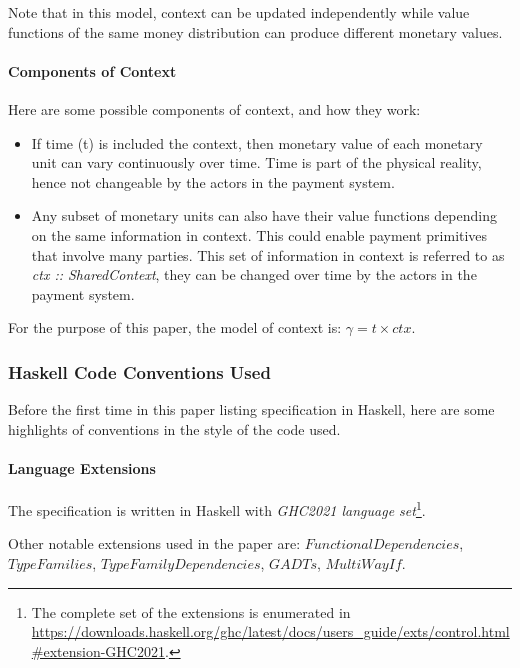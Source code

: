 Note that in this model, context can be updated independently while value functions of the same
money distribution can produce different monetary values.

\paragraph{Components of Context}

Here are some possible components of context, and how they work:

\begin{itemize}
    \item If time (t) is included the context, then monetary value of each monetary unit can vary
continuously over time. Time is part of the physical reality, hence not changeable by the actors in
the payment system.

    \item Any subset of monetary units can also have their value functions depending on the same
information in context. This could enable payment primitives that involve many parties. This set of
information in context is referred to as \textit{ctx :: SharedContext}, they can be changed over
time by the actors in the payment system.
\end{itemize}

For the purpose of this paper, the model of context is: $\gamma = t \times ctx$.

\subsubsection{Haskell Code Conventions Used}

Before the first time in this paper listing specification in Haskell, here are some highlights of
conventions in the style of the code used.

\paragraph{Language Extensions}

The specification is written in Haskell with \textit{GHC2021 language set}\footnote{The complete set
of the extensions is enumerated in
\url{https://downloads.haskell.org/ghc/latest/docs/users_guide/exts/control.html\#extension-GHC2021}.}.

Other notable extensions used in the paper are: $FunctionalDependencies$, $TypeFamilies$,
$TypeFamilyDependencies$, $GADTs$, $MultiWayIf$.

